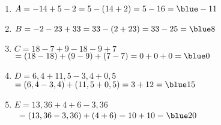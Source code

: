    \ \\[-5mm]
   \begin{enumerate}
      \item $A =-14+5-2 =5-(14+2) =5-16 =\blue -11$
      \item $B =-2-23+33 =33-(2+23) =33-25 =\blue 8$
      \item $C =18-7+9-18-9+7$ \\
          \qquad\; $=(18-18)+(9-9)+(7-7) =0+0+0 =\blue 0$
      \item $D =6,4+11,5-3,4+0,5$ \\
         \qquad\; $=(6,4-3,4)+(11,5+0,5) =3+12 =\blue 15$
   \end{enumerate}

\Coupe

   \begin{enumerate}
   \setcounter{enumi}{4}
      \item $E =13,36+4+6-3,36$ \\
         \qquad\, $=(13,36-3,36)+(4+6) =10+10 =\blue 20$
   \end{enumerate}
